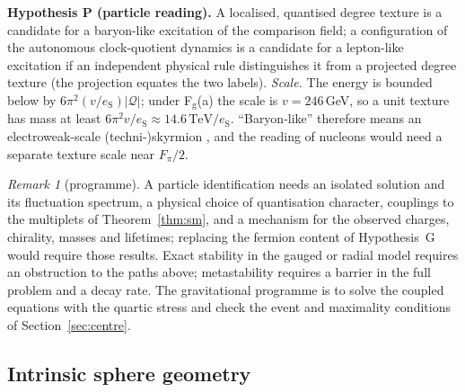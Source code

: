 \documentclass[aps,pra,onecolumn,superscriptaddress,nofootinbib,10pt]{revtex4-2}
\theoremstyle{definition}
\theoremstyle{remark}
\newtheorem{remark}[theorem]{Remark}
\begin{document}
\smallskip\noindent\textbf{Hypothesis P (particle reading).}\label{hyp:P}  A localised, quantised degree texture is a candidate for a
baryon-like excitation of the comparison field; a configuration of the autonomous clock-quotient dynamics is a
candidate for a lepton-like excitation if an independent physical rule distinguishes it from a projected
degree texture (the projection equates the two labels).  \emph{Scale.}  The energy is bounded below by
$6\pi^2(v/e_{\mathrm S})\lvert\mathcal Q\rvert$; under F$_{\mathrm g}$(a) the scale is $v=246$\,GeV, so a unit texture has mass at least
$6\pi^2v/e_{\mathrm S}\approx14.6\,\mathrm{TeV}/e_{\mathrm S}$.  ``Baryon-like'' therefore means an electroweak-scale
(techni-)skyrmion \cite{rf:GipsonTze1981,rf:DHoker1984a,rf:DHoker1984b,rf:AmbjornRubakov1985,rf:Rubakov1985,rf:Eilam1986}, and the reading of nucleons would need a separate
texture scale near $F_\pi/2$.

\begin{remark}[programme]\label{rem:skprogramme}
A particle identification needs an isolated solution and its fluctuation spectrum, a physical choice of
quantisation character, couplings to the multiplets of Theorem~\ref{thm:sm}, and a mechanism for the observed
charges, chirality, masses and lifetimes; replacing the fermion content of Hypothesis~G would require
those results.  Exact stability in the gauged or radial model requires an obstruction to the paths above;
metastability requires a barrier in the full problem and a decay rate.  The gravitational programme is to
solve the coupled equations with the quartic stress and check the event and maximality conditions of
Section~\ref{sec:centre}.
\end{remark}

\subsection{Intrinsic sphere geometry}
\end{document}
